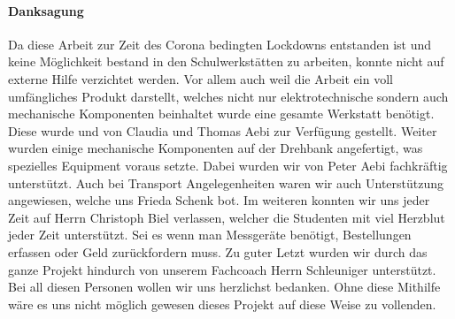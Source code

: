 \paragraph{Danksagung}\mbox{}

Da diese Arbeit zur Zeit des Corona bedingten Lockdowns entstanden ist und keine Möglichkeit bestand in den Schulwerkstätten zu arbeiten, konnte nicht auf externe Hilfe verzichtet werden. Vor allem auch weil die Arbeit ein voll umfängliches Produkt darstellt, welches nicht nur elektrotechnische sondern auch mechanische Komponenten beinhaltet wurde eine gesamte Werkstatt benötigt. Diese wurde und von Claudia und Thomas Aebi zur Verfügung gestellt. Weiter wurden einige mechanische Komponenten auf der Drehbank angefertigt, was spezielles Equipment voraus setzte. Dabei wurden wir von Peter Aebi fachkräftig unterstützt. Auch bei Transport Angelegenheiten waren wir auch Unterstützung angewiesen, welche uns Frieda Schenk bot. Im weiteren konnten wir uns jeder Zeit auf Herrn Christoph Biel verlassen, welcher die Studenten mit viel Herzblut jeder Zeit unterstützt. Sei es wenn man Messgeräte benötigt, Bestellungen erfassen oder Geld zurückfordern muss. Zu guter Letzt wurden wir durch das ganze Projekt hindurch von unserem Fachcoach Herrn Schleuniger unterstützt. Bei all diesen Personen wollen wir uns herzlichst bedanken. Ohne diese Mithilfe wäre es uns nicht möglich gewesen dieses Projekt auf diese Weise zu vollenden.     

\newpage




